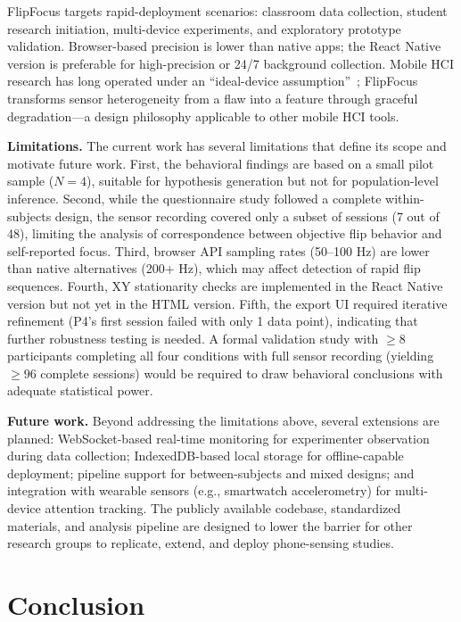 \documentclass[sigconf]{acmart}
\begin{document}
FlipFocus targets rapid-deployment scenarios: classroom data collection, student research initiation, multi-device experiments, and exploratory prototype validation. Browser-based precision is lower than native apps; the React Native version is preferable for high-precision or 24/7 background collection. Mobile HCI research has long operated under an ``ideal-device assumption''~\cite{wac2016smartphone}; FlipFocus transforms sensor heterogeneity from a flaw into a feature through graceful degradation---a design philosophy applicable to other mobile HCI tools.

\textbf{Limitations.} The current work has several limitations that define its scope and motivate future work. First, the behavioral findings are based on a small pilot sample ($N=4$), suitable for hypothesis generation but not for population-level inference. Second, while the questionnaire study followed a complete within-subjects design, the sensor recording covered only a subset of sessions (7 out of 48), limiting the analysis of correspondence between objective flip behavior and self-reported focus. Third, browser API sampling rates (50--100 Hz) are lower than native alternatives (200+ Hz), which may affect detection of rapid flip sequences. Fourth, XY stationarity checks are implemented in the React Native version but not yet in the HTML version. Fifth, the export UI required iterative refinement (P4's first session failed with only 1 data point), indicating that further robustness testing is needed. A formal validation study with $\ge 8$ participants completing all four conditions with full sensor recording (yielding $\ge 96$ complete sessions) would be required to draw behavioral conclusions with adequate statistical power.

\textbf{Future work.} Beyond addressing the limitations above, several extensions are planned: WebSocket-based real-time monitoring for experimenter observation during data collection; IndexedDB-based local storage for offline-capable deployment; pipeline support for between-subjects and mixed designs; and integration with wearable sensors (e.g., smartwatch accelerometry) for multi-device attention tracking. The publicly available codebase, standardized materials, and analysis pipeline are designed to lower the barrier for other research groups to replicate, extend, and deploy phone-sensing studies.

\section{Conclusion}
\end{document}
